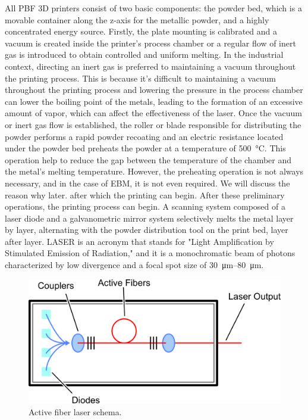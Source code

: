 All PBF 3D printers consist of two basic components: the powder bed, which is a movable container along the z-axis for the metallic powder, and a highly concentrated energy source. 
Firstly, the plate mounting is calibrated and a vacuum is created inside the printer's process chamber or a regular flow of inert gas is introduced to obtain controlled and uniform melting. In the industrial context, directing an inert gas is preferred to maintaining a vacuum throughout the printing process. This is because it's difficult to maintaining a vacuum throughout the printing process and lowering the pressure in the process chamber can lower the boiling point of the metals, leading to the formation of an excessive amount of vapor, which can affect the effectiveness of the laser. Once the vacuum or inert gas flow is established, the roller or blade responsible for distributing the powder performs a rapid powder recoating and an electric resistance located under the powder bed preheats the powder at a temperature of \SI{500}{\degreeCelsius}. This operation help to reduce the gap between the temperature of the chamber and the metal's melting temperature. However, the preheating operation is not always necessary, and in the case of EBM, it is not even required. We will discuss the reason why later. after which the printing can begin. After these preliminary operations, the printing process can begin. A scanning system composed of a laser diode and a galvanometric mirror system selectively melts the metal layer by layer, alternating with the powder distribution tool on the print bed, layer after layer. LASER is an acronym that stands for "Light Amplification by Stimulated Emission of Radiation," and it is a monochromatic beam of photons characterized by low divergence and a focal spot size of \SIrange[range-phrase = --]{30}{80}{\micro\metre}.
\begin{figure}[H]
    \centering
    \includegraphics[scale=0.5]{Images/laser2.png}
    \caption[Laser schema.]{Active fiber laser schema.}
    \label{fig:laser}
\end{figure}
